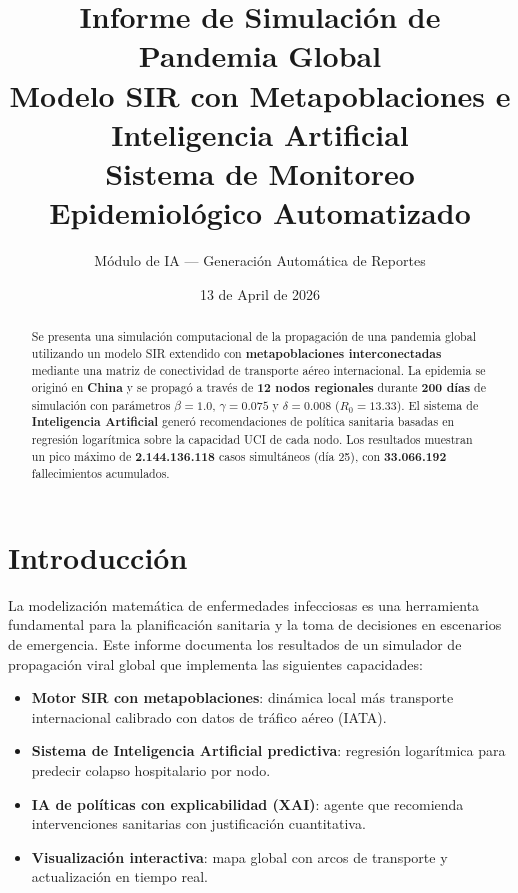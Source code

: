 \documentclass[12pt,a4paper]{article}
\title{
    \vspace{-1cm}
    \Huge\textbf{Informe de Simulación de Pandemia Global}\\[0.5em]
    \Large Modelo SIR con Metapoblaciones e Inteligencia Artificial\\[0.3em]
    \large Sistema de Monitoreo Epidemiológico Automatizado
}
\author{Módulo de IA — Generación Automática de Reportes}
\date{13 de April de 2026}
\begin{document}
\maketitle
\thispagestyle{empty}

\begin{abstract}
\noindent
Se presenta una simulación computacional de la propagación de una pandemia global
utilizando un modelo SIR extendido con \textbf{metapoblaciones interconectadas} mediante
una matriz de conectividad de transporte aéreo internacional. La epidemia se originó en
\textbf{China} y se propagó a través de \textbf{12 nodos
regionales} durante \textbf{200 días} de simulación con parámetros
$\beta=1.0$, $\gamma=0.075$ y $\delta=0.008$
($R_0 = 13.33$).
El sistema de \textbf{Inteligencia Artificial} generó recomendaciones de política sanitaria
basadas en regresión logarítmica sobre la capacidad UCI de cada nodo.
Los resultados muestran un pico máximo de \textbf{2.144.136.118} casos
simultáneos (día 25), con \textbf{33.066.192}
fallecimientos acumulados.
\end{abstract}

\tableofcontents
\newpage

\section{Introducción}

La modelización matemática de enfermedades infecciosas es una herramienta fundamental
para la planificación sanitaria y la toma de decisiones en escenarios de emergencia.
Este informe documenta los resultados de un simulador de propagación viral global que
implementa las siguientes capacidades:

\begin{itemize}
    \item \textbf{Motor SIR con metapoblaciones}: dinámica local más transporte
          internacional calibrado con datos de tráfico aéreo (IATA).
    \item \textbf{Sistema de Inteligencia Artificial predictiva}: regresión logarítmica
          para predecir colapso hospitalario por nodo.
    \item \textbf{IA de políticas con explicabilidad (XAI)}: agente que recomienda
          intervenciones sanitarias con justificación cuantitativa.
    \item \textbf{Visualización interactiva}: mapa global con arcos de transporte y
          actualización en tiempo real.
\end{itemize}
\end{document}
